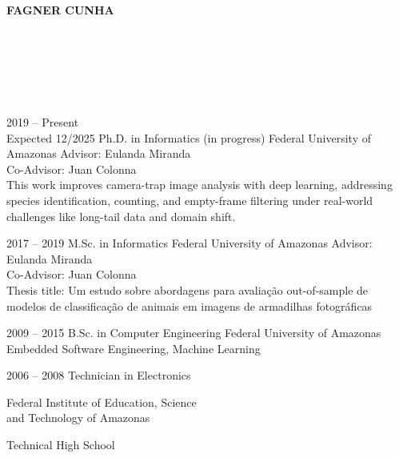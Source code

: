 \documentclass[10pt]{developercv} %
\begin{document}
\pagestyle{plain}

\begin{minipage}[t]{0.6\textwidth}
  \vspace{-\baselineskip} %

  {\HUGE\textbf{\MakeUppercase{Fagner Cunha}}}
  \vspace{5pt}

  \\

\end{minipage}
\begin{minipage}[t]{0.3\textwidth}
  \vspace{-\baselineskip} %

 \\
\\ \\
\end{minipage}

\vspace{0.5cm}



\begin{entrylist}
  \entry
  {2019 -- Present\\\footnotesize{Expected 12/2025}}
  {Ph.D. in Informatics (in progress)}
  {Federal University of Amazonas}
  {Advisor: Eulanda Miranda\\Co-Advisor: Juan Colonna\\
  This work improves camera-trap image analysis with deep learning, addressing
species identification, counting, and empty-frame filtering under real-world
challenges like long-tail data and domain shift.
  }

  \entry
  {2017 -- 2019}
  {M.Sc. in Informatics}
  {Federal University of Amazonas}
  {Advisor: Eulanda Miranda\\Co-Advisor: Juan Colonna\\
  Thesis title: Um estudo sobre abordagens para avaliação out-of-sample de
modelos de classificação de animais em imagens de armadilhas fotográficas}

  \entry
  {2009 -- 2015}
  {B.Sc. in Computer Engineering}
  {Federal University of Amazonas}
  {Embedded Software Engineering, Machine Learning}

 \entry
  {2006 -- 2008}
  {Technician in Electronics}
  {\parbox[t]{6.5cm}{\raggedleft Federal Institute of Education, Science \\ and
Technology of Amazonas}}
  {Technical High School}
\end{entrylist}
\end{document}
